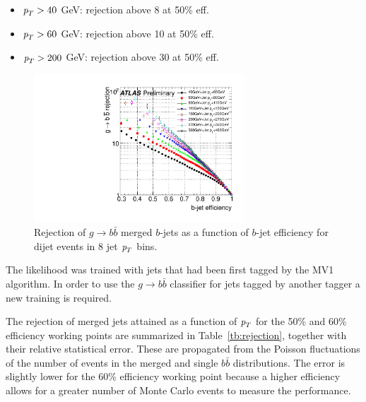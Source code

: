 \begin{itemize}\addtolength{\itemsep}{-0.4\baselineskip}
\item
${\emph{p}_{T}}>40$ GeV: %
rejection above 8 at 50\% eff.
\item
${\emph{p}_{T}}>60$ GeV: %
rejection above 10 at 50\% eff.
\item
${\emph{p}_{T}}>200$ GeV: %
rejection above 30 at 50\% eff.
\end{itemize}


\begin{figure}[tp]
\centering
\includegraphics[width=0.7\textwidth]{FIGS/Likelihood/KDE_RejvsEff.pdf}
\caption{Rejection of $g\rightarrow b \bar{b}$ merged $b$-jets as a function of $b$-jet efficiency for dijet events in 8 jet ${\emph{p}_{T}}$ bins.}
\label{fig:performanceinbins}
\end{figure}

The likelihood was trained with jets that had been first tagged by the MV1 algorithm. In order to use the  $g\rightarrow b \bar{b}$ classifier for jets tagged by another tagger a new training is required.

The rejection of merged jets attained as a function of ${\emph{p}_{T}}$ for the 50\% and 60\% efficiency working points are summarized in Table~\ref{tb:rejection}, together with their relative statistical error. These are propagated from the Poisson fluctuations of the number of events in the merged and single $b\bar{b}$ distributions. The error is slightly lower for the 60\% efficiency working point because a higher efficiency allows for a greater number of Monte Carlo events to measure the performance. %

